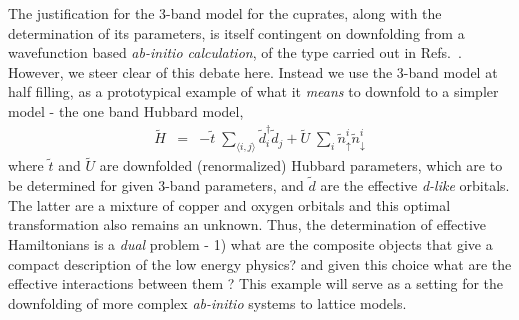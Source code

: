 \documentclass[prl,12pt,onecolumn,nofootinbib,notitlepage,english,superscriptaddress]{revtex4-1}
\begin{document}
The justification for the 3-band model for the cuprates, along with the determination of its parameters, 
is itself contingent on downfolding from a wavefunction based \emph{ab-initio calculation}, 
of the type carried out in Refs.~\cite{Wagner_Abbamonte}. However, we steer clear of this debate here. 
Instead we use the 3-band model at half filling, as a prototypical example of what it \emph{means} to downfold to 
a simpler model - the one band Hubbard model, 
\begin{eqnarray}
	\tilde{H} &=&  -\tilde{t} \;\sum_{\langle i,j \rangle} \tilde{d}_i^{\dagger} \tilde{d}_j + \tilde{U}\;\sum_{i} \tilde{n}^{i}_{\uparrow} \tilde{n}^{i}_{\downarrow}
\label{eq:oneband}
\end{eqnarray}
where $\tilde{t}$ and $\tilde{U}$ are downfolded (renormalized) Hubbard parameters, which are to 
be determined for given 3-band parameters, and $\tilde{d}$ are the effective \emph{d-like} orbitals. 
The latter are a mixture of copper and oxygen orbitals and this optimal transformation also remains an unknown. Thus, 
the determination of effective Hamiltonians is a \emph{dual} problem - 1) what are the composite objects that give a 
compact description of the low energy physics? and given this choice what are the effective interactions between them ?  
This example will serve as a setting for the downfolding of more complex \emph{ab-initio} systems to lattice 
models. 
\end{document}
